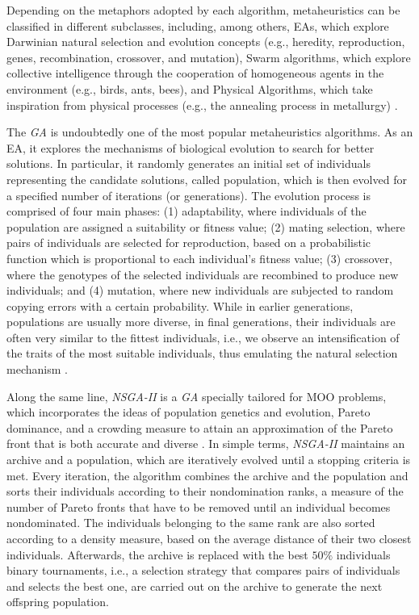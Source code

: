	Depending on the metaphors adopted by each algorithm, metaheuristics can be classified in different subclasses, including, among others, \acp{EA}, which explore Darwinian natural selection and evolution concepts (e.g., heredity, reproduction, genes, recombination, crossover, and mutation), Swarm algorithms, which explore collective intelligence through the cooperation of homogeneous agents in the environment (e.g., birds, ants, bees), and Physical Algorithms, which take inspiration from physical processes (e.g., the annealing process in metallurgy) \cite{Brownlee2011}.
	
	The \textit{\ac{GA}} is undoubtedly one of the most popular metaheuristics algorithms. As an \ac{EA}, it explores the mechanisms of biological evolution to search for better solutions. In particular, it randomly generates an initial set of individuals representing the candidate solutions, called population, which is then evolved for a specified number of iterations (or generations). The evolution process is comprised of four main phases: (1) adaptability, where individuals of the population are assigned a suitability or fitness value; (2) mating selection, where pairs of individuals are selected for reproduction, based on a probabilistic function which is proportional to each individual's fitness value; (3) crossover, where the genotypes of the selected individuals are recombined to produce new individuals; and (4) mutation, where new individuals are subjected to random copying errors with a certain probability. While in earlier generations, populations are usually more diverse, in final generations, their individuals are often very similar to the fittest individuals, i.e., we observe an intensification of the traits of the most suitable individuals, thus emulating the natural selection mechanism \cite{Brownlee2011}. %
	
	Along the same line, \textit{\ac{NSGA-II}} is a \textit{\ac{GA}} specially tailored for \ac{MOO} problems, which incorporates the ideas of population genetics and evolution, Pareto dominance, and a crowding measure to attain an approximation of the Pareto front that is both accurate and diverse \cite{Deb2002}. In simple terms, \textit{\ac{NSGA-II}} maintains an archive and a population, which are iteratively evolved until a stopping criteria is met. Every iteration, the algorithm combines the archive and the population and sorts their individuals according to their nondomination ranks, a measure of the number of Pareto fronts that have to be removed until an individual becomes nondominated. The individuals belonging to the same rank are also sorted according to a density measure, based on the average distance of their two closest individuals. Afterwards, the archive is replaced with the best $50\%$ individuals binary tournaments, i.e., a selection strategy that compares pairs of individuals and selects the best one, are carried out on the archive to generate the next offspring population. 

